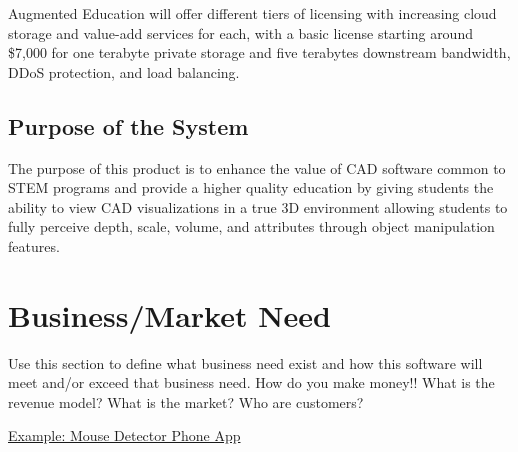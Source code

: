 Augmented Education will offer different tiers of licensing with increasing cloud storage and value-add services for each, with a basic license starting around \$7,000 for one terabyte private storage and five terabytes downstream bandwidth, DDoS protection, and load balancing. 


\subsection{Purpose of the System}

The purpose of this product is to enhance the value of CAD software common to STEM programs and provide a higher quality education by giving students the ability to view CAD visualizations in a true 3D environment allowing students to fully perceive depth, scale, volume, and attributes through object manipulation features.


\section{Business/Market Need}
Use this section to define what business need exist and how this software will 
meet and/or exceed that business need.    How do you make money!!  What is the revenue model?  What is the market? Who are customers?

\noindent
\underline{Example:  Mouse Detector Phone App}

